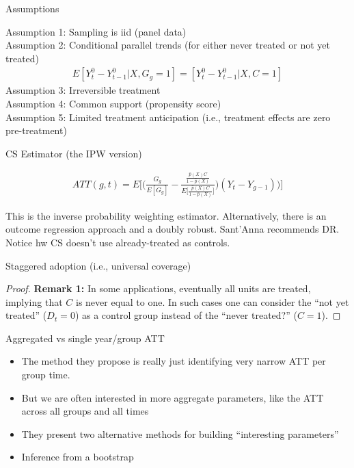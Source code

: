\documentclass{beamer}
\begin{document}
\begin{frame}{Assumptions}

Assumption 1: Sampling is iid (panel data) \\
\bigskip
Assumption 2: Conditional parallel trends (for either never treated or not yet treated) \\
\begin{eqnarray*}
E[Y_t^0 - Y_{t-1}^0 | X,G_g=1] = [Y_t^0 - Y_{t-1}^0 | X,C=1] 
\end{eqnarray*}
\bigskip
Assumption 3: Irreversible treatment \\
Assumption 4: Common support (propensity score) \\
\bigskip
Assumption 5: Limited treatment anticipation (i.e., treatment effects are zero pre-treatment)

\end{frame}

\begin{frame}{CS Estimator (the IPW version)}

\begin{eqnarray*}
ATT(g,t) = E \bigg [ \bigg ( \frac{G_g}{E[G_g]} - \frac{ \frac{\hat{p}(X)C}{1-\hat{p}(X)}}{E \bigg [ \frac{\hat{p}(X)C}{1-\hat{p}(X)} \bigg ]} \bigg ) (Y_t - Y_{g-1} ) \bigg ) \bigg ]
\end{eqnarray*}

This is the inverse probability weighting estimator.  Alternatively, there is an outcome regression approach and a doubly robust. Sant'Anna recommends DR. Notice hw CS doesn't use already-treated as controls.
\end{frame}



\begin{frame}{Staggered adoption (i.e., universal coverage)}


\begin{proof}{\textbf{Remark 1:}}
In some applications, eventually all units are treated, implying that $C$ is never equal to one. In such cases one can consider the ``not yet treated'' ($D_t = 0$) as a control group instead of
the ``never treated?'' ($C = 1$).
\end{proof}

\end{frame}

\begin{frame}{Aggregated vs single year/group ATT}

\begin{itemize}
\item The method they propose is really just identifying very narrow ATT per group time.
\item But we are often interested in  more aggregate parameters, like the ATT across all groups and all times
\item They present two alternative methods for building ``interesting parameters'' 
\item Inference from a bootstrap
\end{itemize}


\end{frame}
\end{document}
